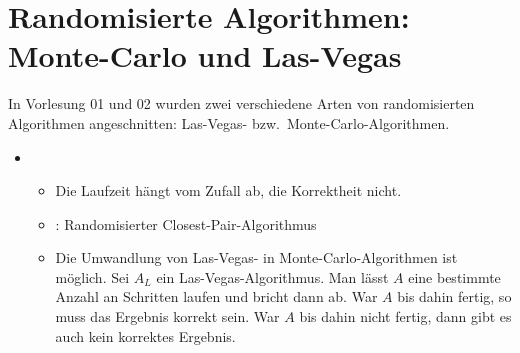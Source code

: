 \documentclass{scrartcl}%
\begin{document}
    \section*{Randomisierte Algorithmen: Monte-Carlo und Las-Vegas}
    In Vorlesung 01 und 02 wurden zwei verschiedene Arten von randomisierten Algorithmen angeschnitten:
    Las-Vegas- bzw.\ Monte-Carlo-Algorithmen.

    \begin{itemize}
        \item {}
        \begin{itemize}
            \item {} Die Laufzeit hängt vom Zufall ab, die Korrektheit nicht.
            \item {}: Randomisierter Closest-Pair-Algorithmus
            \item {}
            Die Umwandlung von Las-Vegas- in Monte-Carlo-Algorithmen ist möglich.
            Sei $A_L$ ein Las-Vegas-Algorithmus.
            Man lässt $A$ eine bestimmte Anzahl an Schritten laufen und bricht dann ab.
            War $A$ bis dahin fertig, so muss das Ergebnis korrekt sein.
            War $A$ bis dahin nicht fertig, dann gibt es auch kein korrektes Ergebnis.


\end{itemize}
\end{itemize}
\end{document}
